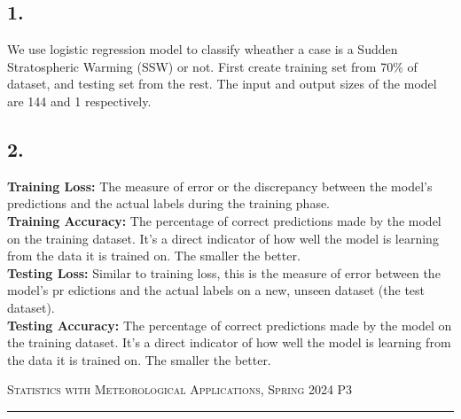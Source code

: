 \documentclass{article}
\begin{document}
\begin{CJK*}{UTF8}{bsmi}
\begin{spacing}{2.5}
\begin{large}
            \subsection*{1.}
                We use logistic regression model to classify wheather a case is a Sudden Stratospheric Warming
                (SSW) or not. First create training set from 70\% of dataset, and testing set from the rest.
                The input and output sizes of the model are 144 and 1 respectively.
            \subsection*{2.}
            \textbf{Training Loss:} The measure of error or the discrepancy between the model’s predictions and 
            the actual labels during the training phase. \\
            \textbf{Training Accuracy:} The percentage of correct predictions made by the model on the training 
            dataset. It’s a direct indicator of how well the model is learning from the data it is trained on.
            The smaller the better.\\
            \textbf{Testing Loss:} Similar to training loss, this is the measure of error between the model’s pr
            edictions and the actual labels on a new, unseen dataset (the test dataset).\\
            \textbf{Testing Accuracy:} The percentage of correct predictions made by the model on the training 
            dataset. It’s a direct indicator of how well the model is learning from the data it is trained on.
            The smaller the better.\\

        \end{large}
    \end{spacing}

\newpage
\thispagestyle{empty}
\hfill {\scshape \large Statistics with Meteorological Applications, Spring 2024} \hfill {\scshape P3}
\smallskip
\hrule


\end{CJK*}
\end{document}
